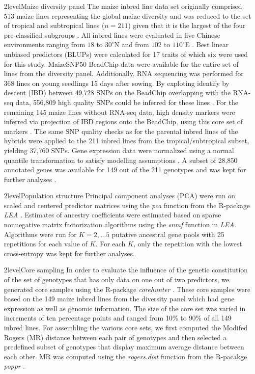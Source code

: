 \documentclass[12pt,titlepage]{article}
\begin{document}
\Genetics2level{Maize diversity panel}
The maize inbred line data set originally comprised 513 maize lines representing 
the global maize diversity and was reduced to the set of tropical and
subtropical lines ($n = 211$) given that it is the largest of the four
pre-classified subgroups \cite{Yang2014}.
All inbred lines were evaluated in five Chinese environments ranging from
$18$ to $30^{\circ}$N and from $102$ to $110^{\circ}$E \cite{Yang2014}.
Best linear unbiased predictors (BLUPs) were calculated for 17 traits of which 
six were used for this study.
MaizeSNP50 BeadChip-data were available for the entire set of lines from the
diversity panel.
Additionally, RNA sequencing was performed for 368 lines on young seedlings 15 
days after sowing.
By exploting identify by descent (IBD) between 49,728 SNPs on the BeadChip 
overlapping with the RNA-seq data, 556,809 high quality SNPs could be inferred 
for these lines \cite{Fu2013,Li2013}.
For the remaining 145 maize lines without RNA-seq data, high density markers
were inferred via projection of IBD regions onto the BeadChip, using this core 
set of markers \cite{Yang2014}.
The same SNP quality checks as for the parental inbred lines of the hybrids
were applied to the 211 inbred lines from the tropical/subtropical subset,
yielding 37,760 SNPs.
Gene expression data were normalized using a normal quantile transformation to
satisfy modelling assumptions \cite{Fu2013}.
A subset of 28,850 annotated genes was available for 149 out of the 211
genotypes and was kept for further analyses \cite{Li2013}.



\Genetics2level{Population structure}
Principal component analyses (PCA) were run on scaled and centered predictor 
matrices using the \emph{pca} function from the R-package \textit{LEA} 
\cite{Frichot2015}.
Estimates of ancestry coefficients were estimated based on sparse nonnegative
matrix factorization algorithms \cite{Frichot2014} using the \emph{snmf} 
function in \textit{LEA}.
Algorithms were run for $K=2, \dots 5$ putative ancestral gene pools with 25
repetitions for each value of $K$. 
For each $K$, only the repetition with the lowest cross-entropy was kept for 
further analyses.



\Genetics2level{Core sampling}
In order to evaluate the influence of the genetic constitution of the set of
genotypes that has only data on one out of two predictors, we generated core 
samples using the R-package \textit{corehunter} \cite{Thachuk2009}.
These core samples were based on the 149 maize inbred lines from the diversity
panel which had gene expression as well as genomic information.
The size of the core set was varied in increments of ten percentage points and 
ranged from 10\% to 90\% of all 149 inbred lines.
For assembling the various core sets, we first computed the Modifed Rogers (MR)
distance between each pair of genotypes and then selected a predefined subset
of genotypes that display maximum average distance between each other.
MR was computed using the \emph{rogers.dist} function from the R-pacakge
\textit{poppr} \cite{Kamvar2015}.
\end{document}

